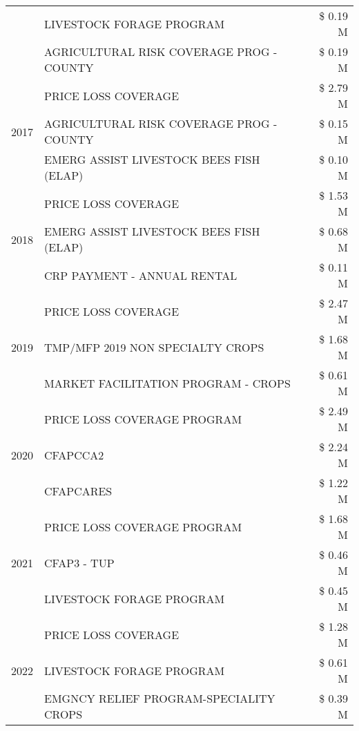 \begin{tabular}{llr}
 & LIVESTOCK FORAGE PROGRAM & \$ 0.19 M \\
 & AGRICULTURAL RISK COVERAGE PROG - COUNTY & \$ 0.19 M \\
\cline{1-3}
\multirow[t]{3}{*}{2017} & PRICE LOSS COVERAGE & \$ 2.79 M \\
 & AGRICULTURAL RISK COVERAGE PROG - COUNTY & \$ 0.15 M \\
 & EMERG ASSIST LIVESTOCK BEES FISH (ELAP) & \$ 0.10 M \\
\cline{1-3}
\multirow[t]{3}{*}{2018} & PRICE LOSS COVERAGE & \$ 1.53 M \\
 & EMERG ASSIST LIVESTOCK BEES FISH (ELAP) & \$ 0.68 M \\
 & CRP PAYMENT - ANNUAL RENTAL & \$ 0.11 M \\
\cline{1-3}
\multirow[t]{3}{*}{2019} & PRICE LOSS COVERAGE & \$ 2.47 M \\
 & TMP/MFP 2019 NON SPECIALTY CROPS & \$ 1.68 M \\
 & MARKET FACILITATION PROGRAM - CROPS & \$ 0.61 M \\
\cline{1-3}
\multirow[t]{3}{*}{2020} & PRICE LOSS COVERAGE PROGRAM & \$ 2.49 M \\
 & CFAPCCA2 & \$ 2.24 M \\
 & CFAPCARES & \$ 1.22 M \\
\cline{1-3}
\multirow[t]{3}{*}{2021} & PRICE LOSS COVERAGE PROGRAM & \$ 1.68 M \\
 & CFAP3 - TUP & \$ 0.46 M \\
 & LIVESTOCK FORAGE PROGRAM & \$ 0.45 M \\
\cline{1-3}
\multirow[t]{3}{*}{2022} & PRICE LOSS COVERAGE & \$ 1.28 M \\
 & LIVESTOCK FORAGE PROGRAM & \$ 0.61 M \\
 & EMGNCY RELIEF PROGRAM-SPECIALITY CROPS & \$ 0.39 M \\
\cline{1-3}
\bottomrule
\end{tabular}
